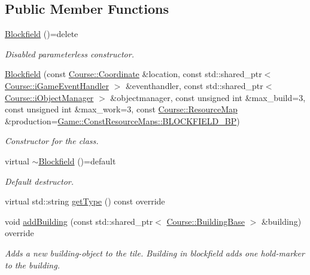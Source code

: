 \subsection*{Public Member Functions}
\begin{DoxyCompactItemize}
\item 
\hyperlink{classGame_1_1Blockfield_a7970ee32ecccf5c3b81e71a4c4554375}{Blockfield} ()=delete
\begin{DoxyCompactList}\small\item\em Disabled parameterless constructor. \end{DoxyCompactList}\item 
\hyperlink{classGame_1_1Blockfield_a103d7f67c9c7ae2a20f04d8d785ad6ad}{Blockfield} (const \hyperlink{classCourse_1_1Coordinate}{Course\-::\-Coordinate} \&location, const std\-::shared\-\_\-ptr$<$ \hyperlink{classCourse_1_1iGameEventHandler}{Course\-::i\-Game\-Event\-Handler} $>$ \&eventhandler, const std\-::shared\-\_\-ptr$<$ \hyperlink{classCourse_1_1iObjectManager}{Course\-::i\-Object\-Manager} $>$ \&objectmanager, const unsigned int \&max\-\_\-build=3, const unsigned int \&max\-\_\-work=3, const \hyperlink{namespaceCourse_ab9a46ed9cd00485e318e5731ea2f78d9}{Course\-::\-Resource\-Map} \&production=\hyperlink{namespaceGame_1_1ConstResourceMaps_aca102e5c0cc70c09b1934a785bca2b91}{Game\-::\-Const\-Resource\-Maps\-::\-B\-L\-O\-C\-K\-F\-I\-E\-L\-D\-\_\-\-B\-P})
\begin{DoxyCompactList}\small\item\em Constructor for the class. \end{DoxyCompactList}\item 
virtual \hyperlink{classGame_1_1Blockfield_abeea15b0150fd65a357dce47e09131eb}{$\sim$\-Blockfield} ()=default
\begin{DoxyCompactList}\small\item\em Default destructor. \end{DoxyCompactList}\item 
virtual std\-::string \hyperlink{classGame_1_1Blockfield_af5e2a4c262cb1f59e442b60c8404b715}{get\-Type} () const override
\item 
void \hyperlink{classGame_1_1Blockfield_a7b6ecdadde2797965d6fbbe640d664bc}{add\-Building} (const std\-::shared\-\_\-ptr$<$ \hyperlink{classCourse_1_1BuildingBase}{Course\-::\-Building\-Base} $>$ \&building) override
\begin{DoxyCompactList}\small\item\em Adds a new building-\/object to the tile. Building in blockfield adds one hold-\/marker to the building. \end{DoxyCompactList}\end{DoxyCompactItemize}
